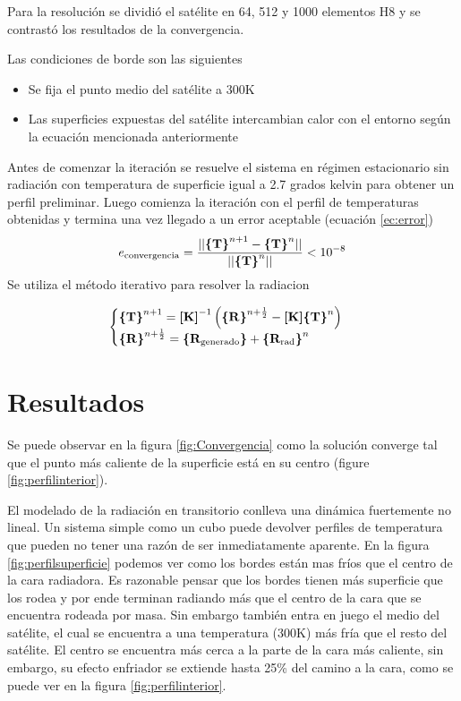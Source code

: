 \documentclass[onecolumn,10pt,titlepage,a4paper]{article}
\begin{document}
Para la resolución se dividió el satélite en 64, 512 y 1000 elementos H8 y se contrastó los resultados de la convergencia.

Las condiciones de borde son las siguientes
\begin{itemize}
	\item Se fija el punto medio del satélite a 300K
	\item Las superficies expuestas del satélite intercambian calor con el entorno según la ecuación mencionada anteriormente
\end{itemize}
Antes de comenzar la iteración se resuelve el sistema en régimen estacionario sin radiación con temperatura de superficie igual a 2.7 grados kelvin para obtener un perfil preliminar. Luego comienza la iteración con el perfil de temperaturas obtenidas y termina una vez llegado a un error aceptable (ecuación \ref{ec:error})
\begin{equation}\label{ec:error}
	e_{\mathrm{convergencia}}=\frac{||\boldsymbol{\{ }\mathbf{T} \boldsymbol{\}}^{n+1}-\boldsymbol{\{ }\mathbf{T} \boldsymbol{\}}^{n}||}{||\boldsymbol{\{ }\mathbf{T} \boldsymbol{\}}^{n}||} < 10^{-8}
\end{equation}
Se utiliza el método iterativo para resolver la radiacion

\begin{equation}
\begin{cases}
	\boldsymbol{\{ }\mathbf{T} \boldsymbol{\}}^{n+1} =  \boldsymbol{[}\mathbf{K} \boldsymbol{]} ^{-1}  \left(\boldsymbol{\{ }\mathbf{R} \boldsymbol{\}}^{n+\frac{1}{2}}- \boldsymbol{[}\mathbf{K} \boldsymbol{]} \boldsymbol{\{ }\mathbf{T} \boldsymbol{\}}^{n}\right)\\
	\boldsymbol{\{ }\mathbf{R} \boldsymbol{\}}^{n+\frac{1}{2}} = \boldsymbol{\{ }\mathbf{R_{\mathrm{generado}}} \boldsymbol{\}}+ \boldsymbol{\{ }\mathbf{R_{\mathrm{rad}}} \boldsymbol{\}}^{n}  
\end{cases}
\end{equation}

\section*{Resultados}
Se puede observar en la figura \ref{fig:Convergencia} como la solución converge tal que el punto más caliente de la superficie está en su centro (figure \ref{fig:perfilinterior}). 

El modelado de la radiación en transitorio conlleva una dinámica fuertemente no lineal. Un sistema simple como un cubo puede devolver perfiles de temperatura que pueden no tener una razón de ser inmediatamente aparente. En la figura \ref{fig:perfilsuperficie} podemos ver como los bordes están mas fríos que el centro de la cara radiadora. Es razonable pensar que los bordes tienen más superficie que los rodea y por ende terminan radiando más que el centro de la cara que se encuentra rodeada por masa. Sin embargo también entra en juego el medio del satélite, el cual se encuentra a una temperatura (300K) más fría que el resto del satélite. El centro se encuentra más cerca a la parte de la cara más caliente, sin embargo, su efecto enfriador se extiende hasta 25\% del camino a la cara, como se puede ver en la figura \ref{fig:perfilinterior}. 
\end{document}
